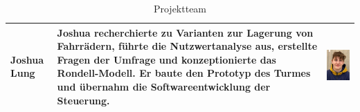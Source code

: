 \begin{table}[H]
\begin{tabular}{lp{}c}
    \midrule
    Joshua Lung   & Joshua recherchierte zu Varianten zur Lagerung von Fahrrädern, führte die Nutzwertanalyse aus, erstellte Fragen der Umfrage und konzeptionierte das Rondell-Modell. Er baute den Prototyp des Turmes und übernahm die Softwareentwicklung der Steuerung. & \begin{minipage}{.2\textwidth}\centering\includegraphics[width=\textwidth]{images/joshualung.jpg}\end{minipage}   \\
    \bottomrule
  \end{tabular}
  \caption{Projektteam}
  \label{tab:projektteam}
\end{table}


